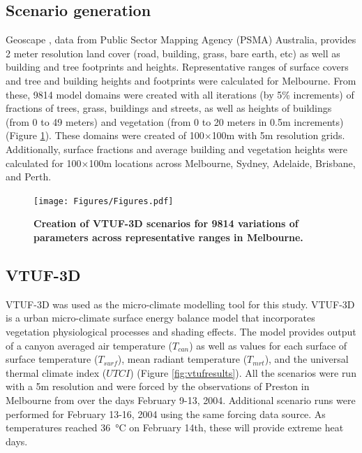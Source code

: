 \documentclass[final,3p,times,authoryear]{elsarticle}
\begin{document}
\subsection{Scenario generation}\label{sec:methodsgen}
Geoscape \citep{Geoscape2020}, data from Public Sector Mapping Agency (PSMA) Australia, provides 2 meter resolution land cover (road, building, grass, bare earth, etc) as well as building and tree footprints and heights. Representative ranges of surface covers and tree and building heights and footprints were calculated for Melbourne.  From these, 9814 model domains were created with all iterations (by 5\% increments) of fractions of trees, grass, buildings and streets, as well as heights of buildings (from 0 to 49 meters) and vegetation (from 0 to 20 meters in 0.5m increments) (Figure \ref{fig:scenarios}). These domains were created of 100$\times$100m with 5m resolution grids. Additionally, surface fractions and average building and vegetation heights were calculated for 100$\times$100m locations across Melbourne, Sydney, Adelaide, Brisbane, and Perth. 


\begin{figure}
\centering
\texttt{[image: Figures/Figures.pdf]}
\caption{\bf Creation of VTUF-3D scenarios for 9814 variations of parameters across representative ranges in Melbourne.}
 \label{fig:scenarios}
\end{figure} 




\subsection{VTUF-3D}\label{sec:methodsvtuf}
VTUF-3D \citep{Nice2018a} was used as the micro-climate modelling tool for this study. VTUF-3D is a urban micro-climate surface energy balance model that incorporates vegetation physiological processes and shading effects. The model provides output of a canyon averaged air temperature ($T_{can}$) as well as values for each surface of surface temperature ($T_{surf}$), mean radiant temperature ($T_{mrt}$), and the universal thermal climate index ($UTCI$) (Figure \ref{fig:vtufresults}). All the scenarios were run with a 5m resolution and were forced by the observations of Preston in Melbourne from \cite{Coutts2007} over the days February 9-13, 2004. Additional scenario runs were performed for February 13-16, 2004 using the same forcing data source. As temperatures reached 36\SI{}{\degreeCelsius} on February 14th, these will provide extreme heat days.
\end{document}
